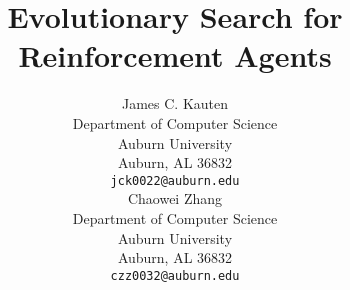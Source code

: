 \title{Evolutionary Search for Reinforcement Agents}

\author{
	James C. Kauten \\
	Department of Computer Science \\
	Auburn University \\
	Auburn, AL 36832 \\
	\texttt{jck0022@auburn.edu} \\
	\And
	Chaowei Zhang \\
	Department of Computer Science \\
	Auburn University \\
	Auburn, AL 36832 \\
	\texttt{czz0032@auburn.edu} \\
}

\maketitle
